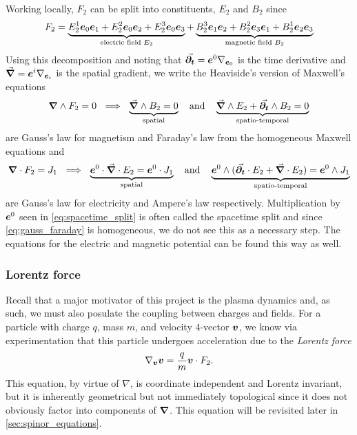 \documentclass[conf]{new-aiaa}
\begin{document}
Working locally, $F_2$ can be split into constituents, $E_2$ and $B_2$ since
\begin{align}
	F_2 = \underbrace{E_2^1 \boldsymbol{e}_0 \boldsymbol{e}_1 + E_2^2 \boldsymbol{e}_0 \boldsymbol{e}_2 + E_2^3 \boldsymbol{e}_0 \boldsymbol{e}_3}_{\textrm{electric field } E_2} + \underbrace{B_2^{3} \boldsymbol{e}_1 \boldsymbol{e}_2 + B_2^{2} \boldsymbol{e}_3 \boldsymbol{e}_1 + B_2^{1} \boldsymbol{e}_2 \boldsymbol{e}_3}_{\textrm{magnetic field } B_2}
\end{align}
Using this decomposition and noting that $\vec{\boldsymbol{\partial_t}}=\boldsymbol{e}^0 \nabla_{\boldsymbol{e}_0}$ is the time derivative and  $\vec{\boldsymbol{\nabla}} = \boldsymbol{e}^i \nabla_{\boldsymbol{e}_i}$ is the spatial gradient, we write the Heaviside's version of Maxwell's equations
\begin{align}
\label{eq:gauss_faraday}
	\boldsymbol{\nabla} \wedge F_2=0 ~\implies~ \underbrace{\vec{\boldsymbol{\nabla}} \wedge B_2 = 0}_{\textrm{spatial}} ~~~\textrm{and}~~~ \underbrace{\vec{\boldsymbol{\nabla}} \wedge E_2 + \vec{\boldsymbol{\partial_t}} \wedge B_2 = 0}_{\textrm{spatio-temporal}}
\end{align}
are Gauss's law for magnetism and Faraday's law from the homogeneous Maxwell equations and
\begin{align}
\label{eq:spacetime_split}
	\boldsymbol{\nabla} \cdot F_2=J_1 ~\implies~ \underbrace{\boldsymbol{e}^0 \cdot \vec{\boldsymbol{\nabla}} \cdot E_2 = \boldsymbol{e}^0 \cdot J_1}_{\textrm{spatial}}~~~\textrm{and}~~~ \underbrace{\boldsymbol{e}^0 \wedge (\vec{\boldsymbol{\partial_t}} \cdot E_2 + \vec{\boldsymbol{\nabla}} \cdot E_2) = \boldsymbol{e}^0 \wedge J_1}_{\textrm{spatio-temporal}}
\end{align}
are Gauss's law for electricity and Ampere's law respectively. Multiplication by $\boldsymbol{e}^0$ seen in \cref{eq:spacetime_split} is often called the spacetime split and since \cref{eq:gauss_faraday} is homogeneous, we do not see this as a necessary step. The equations for the electric and magnetic potential can be found this way as well.

\subsubsection{Lorentz force}

Recall that a major motivator of this project is the plasma dynamics and, as such, we must also posulate the coupling between charges and fields. For a particle with charge $q$, mass $m$, and velocity $4$-vector $\boldsymbol{v}$, we know via experimentation that this particle undergoes acceleration due to the \emph{Lorentz force} 
\begin{equation}
    \label{eq:lorentz_force}
    \nabla_{\boldsymbol{v}}\boldsymbol{v} = \frac{q}{m} \boldsymbol{v} \cdot F_2.
\end{equation}
This equation, by virtue of $\nabla$, is coordinate independent and Lorentz invariant, but it is inherently geometrical but not immediately topological since it does not obviously factor into components of $\boldsymbol{\nabla}$. This equation will be revisited later in \cref{sec:spinor_equations}.
\end{document}
